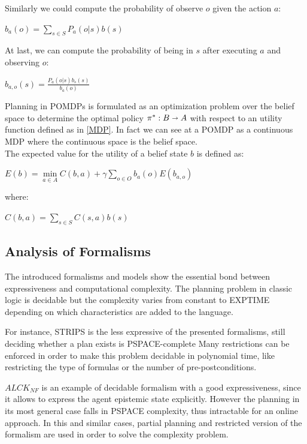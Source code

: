 \documentclass[pdftex,12pt,a4paper]{report}
\begin{document}
\noindent Similarly we could compute the probability of observe $o$ given the action $a$:
\begin{center}
\noindent $b_a(o) = \sum\limits_{s \in S} P_a(o|s)b(s)$ 
\end{center}

\noindent At last, we can compute the probability of being in $s$ after executing $a$ and observing $o$:
\begin{center}
\noindent $b_{a,o}(s) = \frac{P_a(o|s)b_s(s)}{b_a(o)}$ 
\end{center}

\noindent Planning in POMDPs is formulated as an optimization problem over the belief space to determine the optimal policy $\pi^* : B \shortrightarrow A$ with respect to an utility function defined as in \ref{MDP}. In fact we can see at a POMDP as a continuous MDP where the continuous space is the belief space.
\\\noindent The expected value for the utility of a belief state $b$ is defined as:
\begin{center}
\noindent $E(b) = \min\limits_{a \in A} C(b,a) + \gamma \sum\limits_{o \in O}b_a(o)E(b_{a,o})$ 
\end{center}
\noindent where:
\begin{center}
\noindent $C(b,a) = \sum\limits_{s \in S}C(s,a)b(s)$ 
\end{center}

\subsection{Analysis of Formalisms}\label{analysis}
The introduced formalisms and models show the essential bond between expressiveness and computational complexity. The planning problem in classic logic is decidable but the complexity varies from constant to EXPTIME depending on which characteristics are added to the language. 
\newline

\noindent For instance, STRIPS is the less expressive of the presented formalisms, still deciding whether a plan exists is PSPACE-complete \cite{bylander1994computational}%
Many restrictions can be enforced in order to make this problem decidable in polynomial time, like restricting the type of formulas or the number of pre-postconditions. 
\newline

\noindent $ALCK_{NF}$ is an example of decidable formalism with a good expressiveness, since it allows to express the agent epistemic state explicitly. However the planning in its most general case falls in PSPACE complexity, thus intractable for an online approach. In this and similar cases, partial planning and restricted version of the formalism are used in order to solve the complexity problem.
\newline
\end{document}
